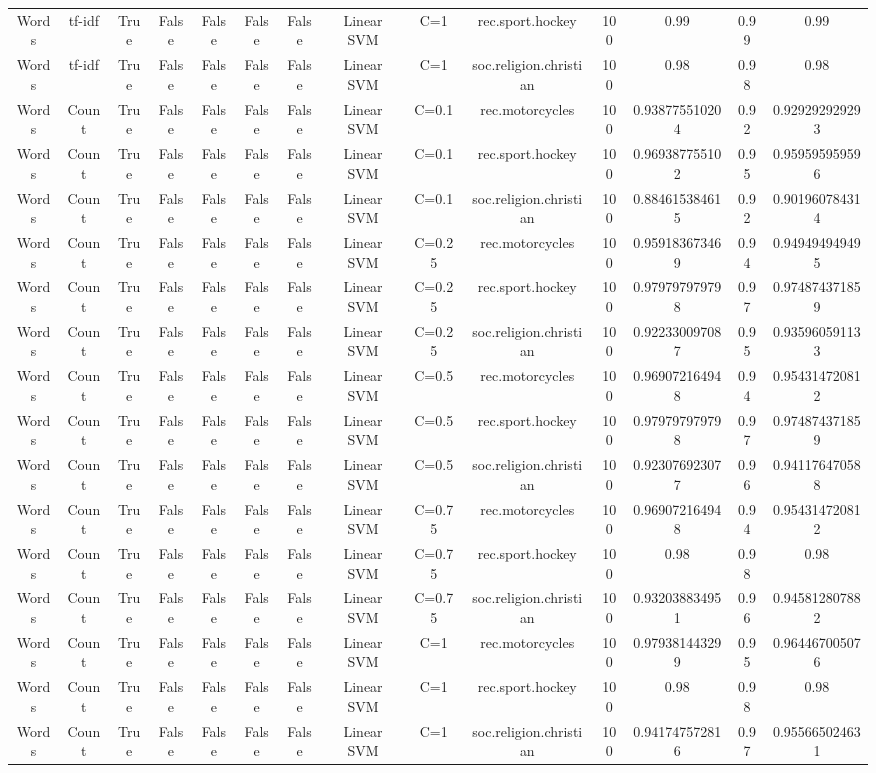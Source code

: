 \documentclass{article}
\begin{document}
\begin{tabular}{|c|c|c|c|c|c|c|c|c|c|c|c|c|c|}
Words & tf-idf & True & False & False & False & False & Linear SVM & C=1 & rec.sport.hockey & 100 & 0.99 & 0.99 & 0.99 \\ 
Words & tf-idf & True & False & False & False & False & Linear SVM & C=1 & soc.religion.christian & 100 & 0.98 & 0.98 & 0.98 \\ 
Words & Count & True & False & False & False & False & Linear SVM & C=0.1 & rec.motorcycles & 100 & 0.938775510204 & 0.92 & 0.929292929293 \\ 
Words & Count & True & False & False & False & False & Linear SVM & C=0.1 & rec.sport.hockey & 100 & 0.969387755102 & 0.95 & 0.959595959596 \\ 
Words & Count & True & False & False & False & False & Linear SVM & C=0.1 & soc.religion.christian & 100 & 0.884615384615 & 0.92 & 0.901960784314 \\ 
Words & Count & True & False & False & False & False & Linear SVM & C=0.25 & rec.motorcycles & 100 & 0.959183673469 & 0.94 & 0.949494949495 \\ 
Words & Count & True & False & False & False & False & Linear SVM & C=0.25 & rec.sport.hockey & 100 & 0.979797979798 & 0.97 & 0.974874371859 \\ 
Words & Count & True & False & False & False & False & Linear SVM & C=0.25 & soc.religion.christian & 100 & 0.922330097087 & 0.95 & 0.935960591133 \\ 
Words & Count & True & False & False & False & False & Linear SVM & C=0.5 & rec.motorcycles & 100 & 0.969072164948 & 0.94 & 0.954314720812 \\ 
Words & Count & True & False & False & False & False & Linear SVM & C=0.5 & rec.sport.hockey & 100 & 0.979797979798 & 0.97 & 0.974874371859 \\ 
Words & Count & True & False & False & False & False & Linear SVM & C=0.5 & soc.religion.christian & 100 & 0.923076923077 & 0.96 & 0.941176470588 \\ 
Words & Count & True & False & False & False & False & Linear SVM & C=0.75 & rec.motorcycles & 100 & 0.969072164948 & 0.94 & 0.954314720812 \\ 
Words & Count & True & False & False & False & False & Linear SVM & C=0.75 & rec.sport.hockey & 100 & 0.98 & 0.98 & 0.98 \\ 
Words & Count & True & False & False & False & False & Linear SVM & C=0.75 & soc.religion.christian & 100 & 0.932038834951 & 0.96 & 0.945812807882 \\ 
Words & Count & True & False & False & False & False & Linear SVM & C=1 & rec.motorcycles & 100 & 0.979381443299 & 0.95 & 0.964467005076 \\ 
Words & Count & True & False & False & False & False & Linear SVM & C=1 & rec.sport.hockey & 100 & 0.98 & 0.98 & 0.98 \\ 
Words & Count & True & False & False & False & False & Linear SVM & C=1 & soc.religion.christian & 100 & 0.941747572816 & 0.97 & 0.955665024631 \\ 
\hline
  \end{tabular}
  
  
  
  
\end{document}
